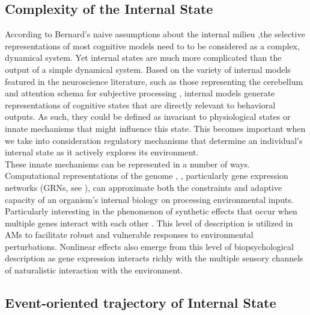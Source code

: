 \documentclass{sigchi}
\begin{document}
\subsection{Complexity of the Internal State}
According to Bernard’s naive assumptions about the internal milieu \cite{Ashby:1960:DFB},the selective representations of most cognitive models need to to be considered as a complex, dynamical system. Yet internal states are much more complicated than the output of a simple dynamical system. Based on the variety of internal models featured in the neuroscience literature, such as those representing the cerebellum \cite{wolpert} and attention schema for subjective processing \cite{graziano}, internal models generate representations of cognitive states that are directly relevant to behavioral outputs. As such, they could be defined as invariant to physiological states or innate mechanisms that might influence this state. This becomes important when we take into consideration regulatory mechanisms that determine an individual’s internal state as it actively explores its environment. \\
These innate mechanisms can be represented in a number of ways. Computational representations of the genome \cite{albert}, \cite{aguilar}, particularly gene expression networks (GRNs, see \cite{cussat}), can approximate both the constraints and adaptive capacity of an organism’s internal biology on processing environmental inputs. Particularly interesting in the phenomenon of synthetic effects that occur when multiple genes interact with each other \cite{sanford}. This level of description is utilized in AMs to facilitate robust and vulnerable responses to environmental perturbations. Nonlinear effects also emerge from this level of biopsychological description as gene expression interacts richly with the multiple sensory channels of naturalistic interaction with the environment.


\subsection{Event-oriented trajectory of Internal State}
\end{document}
